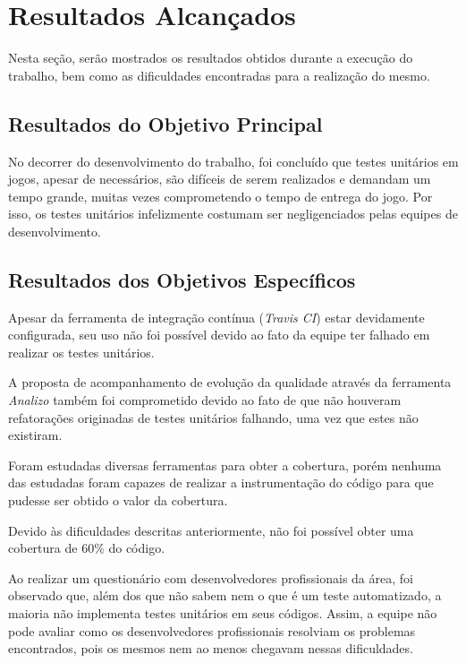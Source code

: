 \chapter[Resultados Alcançados]{Resultados Alcançados}

Nesta seção, serão mostrados os resultados obtidos durante a execução do trabalho, bem como as dificuldades encontradas para a realização do mesmo.

\section{Resultados do Objetivo Principal}

No decorrer do desenvolvimento do trabalho, foi concluído que testes unitários em jogos, apesar de necessários, são difíceis de serem realizados e demandam um tempo grande, muitas vezes comprometendo o tempo de entrega do jogo. Por isso, os testes unitários infelizmente costumam ser negligenciados pelas equipes de desenvolvimento.

\section{Resultados dos Objetivos Específicos}

Apesar da ferramenta de integração contínua (\textit{Travis CI}) estar devidamente configurada, seu uso não foi possível devido ao fato da equipe ter falhado em realizar os testes unitários.

A proposta de acompanhamento de evolução da qualidade através da ferramenta \textit{Analizo} também foi comprometido devido ao fato de que não houveram refatorações originadas de testes unitários falhando, uma vez que estes não existiram.

Foram estudadas diversas ferramentas para obter a cobertura, porém nenhuma das estudadas foram capazes de realizar a instrumentação do código para que pudesse ser obtido o valor da cobertura.

Devido às dificuldades descritas anteriormente, não foi possível obter uma cobertura de 60\% do código.

Ao realizar um questionário com desenvolvedores profissionais da área, foi observado que, além dos que não sabem nem o que é um teste automatizado, a maioria não implementa testes unitários em seus códigos. Assim, a equipe não pode avaliar como os desenvolvedores profissionais resolviam os problemas encontrados, pois os mesmos nem ao menos chegavam nessas dificuldades.

